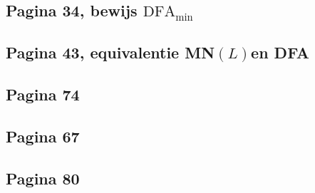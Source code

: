 \documentclass[kulak]{kulakarticle}
\newcommand{\DFA}{\text{DFA}}
\newcommand{\mnl}{MN\((L)\)}
\theoremstyle{definition}
\begin{document}
	

	\newpage
	\subsection*{Pagina 34, bewijs \( \DFA_{\text{min}} \)}

	

	\newpage
	\subsection*{Pagina 43, equivalentie \mnl en DFA}

	

	\subsection*{Pagina 74}

	

	\subsection*{Pagina 67}

	

	\newpage
	\subsection*{Pagina 80}

	
\end{document}
